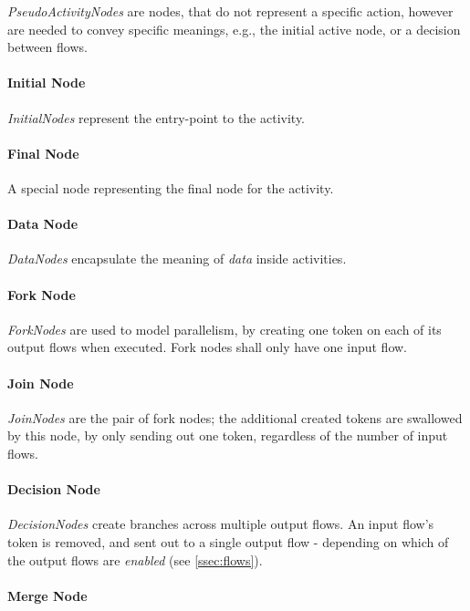 \emph{PseudoActivityNodes} are nodes, that do not represent a specific action, however are needed to convey specific meanings, e.g., the initial active node, or a decision between flows.

\paragraph{Initial Node}

\emph{InitialNodes} represent the entry-point to the activity.

\paragraph{Final Node}

A special node representing the final node for the activity.

\paragraph{Data Node}

\emph{DataNodes} encapsulate the meaning of \emph{data} inside activities.

\paragraph{Fork Node}

\emph{ForkNodes} are used to model parallelism, by creating one token on each of its output flows when executed. Fork nodes shall only have one input flow.

\paragraph{Join Node}

\emph{JoinNodes} are the pair of fork nodes; the additional created tokens are swallowed by this node, by only sending out one token, regardless of the number of input flows.

\paragraph{Decision Node}

\emph{DecisionNodes} create branches across multiple output flows. An input flow's token is removed, and sent out to a single output flow - depending on which of the output flows are \emph{enabled} (see \autoref{ssec:flows}).

\paragraph{Merge Node}

